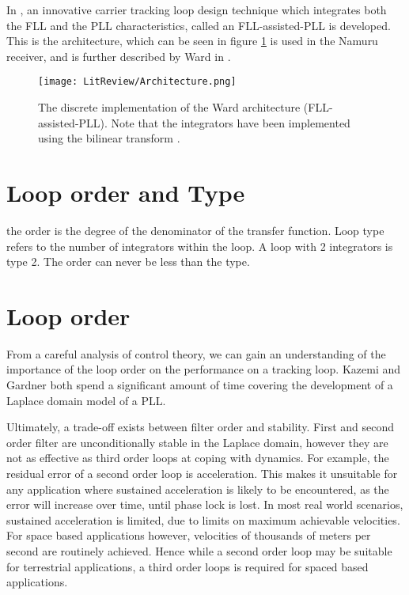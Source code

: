 In \cite{ward1998}, an innovative carrier tracking loop design technique which
integrates both the FLL and the PLL characteristics, called an FLL-assisted-PLL is developed. This is the architecture, which can be seen in figure \ref{fig:Architecture} is used in the Namuru receiver, and is further described by Ward in \cite{Kaplan}.

\begin{figure}[!htb] 
    \centering
    \texttt{[image: LitReview/Architecture.png]} 
    \caption{The discrete implementation of the Ward architecture (FLL-assisted-PLL). Note that the integrators have been implemented using the bilinear transform \cite{Ward}.}
    \label{fig:Architecture}
\end{figure}

\section{Loop order and Type}
the order is the degree of the denominator of the transfer function. 
Loop type refers to the number of integrators within the loop. A loop with 2 integrators is type 2. The order can never be less than the type. \cite{Gardner}

\section{Loop order}
From a careful analysis of control theory, we can gain an understanding of the importance of the loop order on the performance on a tracking loop. Kazemi \cite{KazemiPHD,Kazemi2008} and Gardner \cite{Gardner} both spend a significant amount of time covering the development of a Laplace domain model of a \ac{PLL}. 

Ultimately, a trade-off exists between filter order and stability. First and second order filter are unconditionally stable in the Laplace domain, however they are not as effective as third order loops at coping with dynamics. For example, the residual error of a second order loop is acceleration. This makes it unsuitable for any application where sustained acceleration is likely to be encountered, as the error will increase over time, until phase lock is lost. In most real world scenarios, sustained acceleration is limited, due to limits on maximum achievable velocities. For space based applications however, velocities of thousands of meters per second are routinely achieved. Hence while a second order loop may be suitable for terrestrial applications, a third order loops is required for spaced based applications. 

